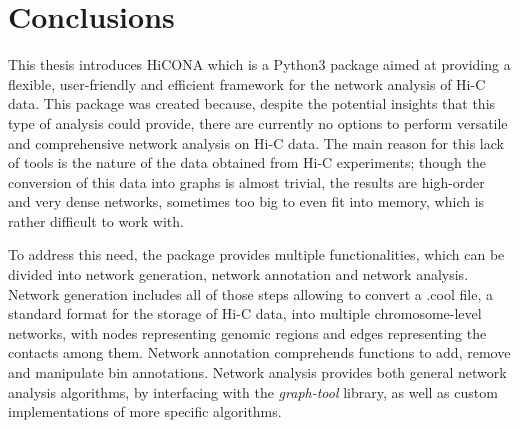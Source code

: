 \graphicspath{{chapters/07_conclusions/}}
\chapter{Conclusions}


This thesis introduces HiCONA which is a Python3 package aimed at providing a flexible, user-friendly and efficient framework for the network analysis of Hi-C data. This package was created because, despite the potential insights that this type of analysis could provide, there are currently no options to perform versatile and comprehensive network analysis on Hi-C data. The main reason for this lack of tools is the nature of the data obtained from Hi-C experiments; though the conversion of this data into graphs is almost trivial, the results are high-order and very dense networks, sometimes too big to even fit into memory, which is rather difficult to work with.

To address this need, the package provides multiple functionalities, which can be divided into network generation, network annotation and network analysis. Network generation includes all of those steps allowing to convert a .cool file, a standard format for the storage of Hi-C data, into multiple chromosome-level networks, with nodes representing genomic regions and edges representing the contacts among them. Network annotation comprehends functions to add, remove and manipulate bin annotations. Network analysis provides both general network analysis algorithms, by interfacing with the \textit{graph-tool} library, as well as custom implementations of more specific algorithms. 

